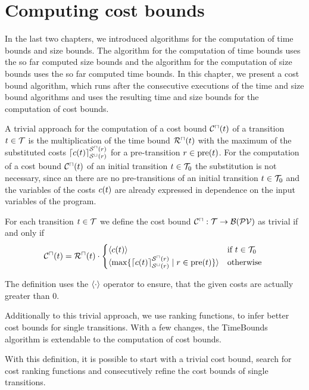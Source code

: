 \section{Computing cost bounds}

In the last two chapters, we introduced algorithms for the computation of time bounds and size bounds.
The algorithm for the computation of time bounds uses the so far computed size bounds and the algorithm for the computation of size bounds uses the so far computed time bounds.
In this chapter, we present a cost bound algorithm, which runs after the consecutive executions of the time and size bound algorithms and uses the resulting time and size bounds for the computation of cost bounds.

A trivial approach for the computation of a cost bound ${\mathcal{C}^\sqcap}(t)$ of a transition $t \in \mathcal{T}$ is the multiplication of the time bound ${\mathcal{R}^\sqcap}(t)$ with the maximum of the substituted costs $\lceil c(t) \rceil^{{\mathcal{S}^\sqcap}(r)}_{{\mathcal{S}^\sqcup}(r)}$ for a pre-transition $r \in \text{pre}(t)$.
For the computation of a cost bound ${\mathcal{C}^\sqcap}(t)$ of an initial transition $t \in \mathcal{T}_0$ the substitution is not necessary, since an there are no pre-transitions of an initial transition $t \in \mathcal{T}_0$ and the variables of the costs $c(t)$ are already expressed in dependence on the input variables of the program.

\begin{definition}
  For each transition $t \in \mathcal{T}$ we define the cost bound ${\mathcal{C}^\sqcap}: \mathcal{T} \rightarrow \mathcal{B}(\mathcal{PV})$ as trivial if and only if
  \[ {\mathcal{C}^\sqcap}(t) = {\mathcal{R}^\sqcap}(t) \cdot
  \begin{cases}
    \langle c(t)\rangle & \text{if } t \in \mathcal{T}_0 \\
    \langle\max \lbrace \lceil c(t) \rceil^{{\mathcal{S}^\sqcap}(r)}_{{\mathcal{S}^\sqcup}(r)} \mid r \in \text{pre}(t) \rbrace\rangle & \text{otherwise }
  \end{cases}
  \]
\end{definition}

The definition uses the $\langle\cdot\rangle$ operator to ensure, that the given costs are actually greater than $0$.


Additionally to this trivial approach, we use ranking functions, to infer better cost bounds for single transitions.
With a few changes, the TimeBounds algorithm is extendable to the computation of cost bounds.



With this definition, it is possible to start with a trivial cost bound, search for cost ranking functions and consecutively refine the cost bounds of single transitions.
